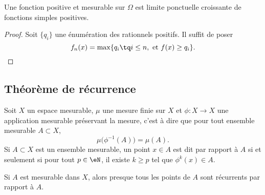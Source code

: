 \begin{proposition}\label{PropWBavIf}
    Une fonction positive et mesurable sur \( \Omega\) est limite ponctuelle croissante de fonctions simples positives.
\end{proposition}

\begin{proof}
    Soit \( \{ q_i \}\) une énumération des rationnels positifs. Il suffit de poser
    \begin{equation}
        f_n(x)=\max\{ q_i\tq i\leq n,\text{ et }f(x)\geq q_i \}.
    \end{equation}
\end{proof}

\subsection{Théorème de récurrence}

Soit \( X\) un espace mesurable, \( \mu\) une mesure finie sur \( X\) et \( \phi\colon X\to X\) une application mesurable préservant la mesure, c'est à dire que pour tout ensemble mesurable \( A\subset X\),
\begin{equation}
    \mu\big( \phi^{-1}(A) \big)=\mu(A).
\end{equation}
Si \( A\subset X\) est un ensemble mesurable, un point \( x\in A\) est dit  par rapport à \( A\) si et seulement si pour tout \( p\in \eN\), il existe \( k\geq p\) tel que \( \phi^k(x)\in A\).

\begin{theorem}     \label{ThoYnLNEL}
    Si \( A\) est mesurable dans \( X\), alors presque tous les points de \( A\) sont récurrents par rapport à \( A\).
\end{theorem}

